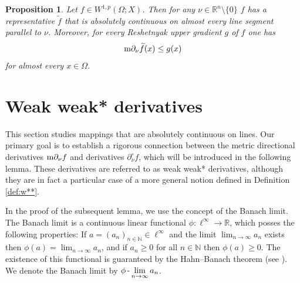 \documentclass[reqno]{amsart}
\newtheorem{prop}[thm]{Proposition}
\begin{document}
\begin{prop}
\label{lem:lemmaAC}
Let $f\in W^{1,p}(\Omega; X)$. Then for any $\nu\in\mathbb R^n\setminus\{0\}$
$f$ has a representative $\widetilde{f}$ that is absolutely continuous on almost every line segment parallel to $\nu$. 
Moreover, for every Reshetnyak upper gradient $g$ of $f$ one has
\begin{equation}\label{eq:lemmaACest}
\textnormal{m}\partial_{\nu} \widetilde{f}(x)\leq g(x)
\end{equation}
for almost every $x\in \Omega$.
\end{prop}

\section{Weak weak* derivatives}\label{sec2}
This section studies mappings that are absolutely continuous on lines.
Our primary goal is to establish a rigorous connection between the metric directional derivatives $\textnormal{m}\partial_\nu f$ and derivatives $\partial^\circ_\nu f$, which will be introduced in the following lemma.
These derivatives are referred to as weak weak* derivatives, although they are in fact a particular case of a more general notion defined in Definition \ref{def:w**}.

In the proof of the subsequent lemma, we use the concept of the Banach limit.
 The Banach limit is a continuous linear functional 
$\phi:\ell^{\infty}\to\mathbb R$, which posses the following properties: 
If $a = (a_n)_{n\in\mathbb N}\in \ell^\infty$ and the limit $\lim_{n\to\infty}a_n$ exists
then $\phi(a) =\lim_{n\to\infty}a_n$, 
and if $a_n\geq 0$   for all $n\in\mathbb N$ then  $\phi(a)\geq 0$.
The existence of this functional is guaranteed by the Hahn--Banach theorem (see \cite[Section 7]{Conway1990}).  
We denote the Banach limit by $\phi\text{\,-}\lim\limits_{n\to\infty} a_n$.
\end{document}
